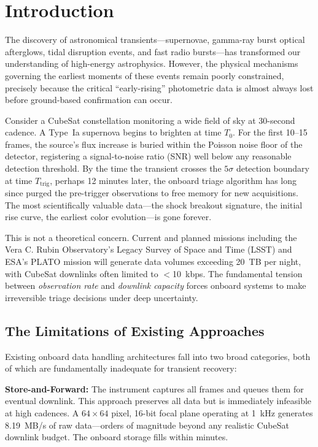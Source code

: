 \documentclass[conference]{IEEEtran}
\begin{document}
\section{Introduction}

The discovery of astronomical transients---supernovae, gamma-ray burst optical afterglows, tidal disruption events, and fast radio bursts---has transformed our understanding of high-energy astrophysics. However, the physical mechanisms governing the earliest moments of these events remain poorly constrained, precisely because the critical ``early-rising'' photometric data is almost always lost before ground-based confirmation can occur.

Consider a CubeSat constellation monitoring a wide field of sky at 30-second cadence. A Type~Ia supernova begins to brighten at time $T_0$. For the first 10--15 frames, the source's flux increase is buried within the Poisson noise floor of the detector, registering a signal-to-noise ratio (SNR) well below any reasonable detection threshold. By the time the transient crosses the $5\sigma$ detection boundary at time $T_{\text{trig}}$, perhaps 12 minutes later, the onboard triage algorithm has long since purged the pre-trigger observations to free memory for new acquisitions. The most scientifically valuable data---the shock breakout signature, the initial rise curve, the earliest color evolution---is gone forever.

This is not a theoretical concern. Current and planned missions including the Vera C. Rubin Observatory's Legacy Survey of Space and Time (LSST) and ESA's PLATO mission will generate data volumes exceeding 20~TB per night, with CubeSat downlinks often limited to $<$10~kbps. The fundamental tension between \textit{observation rate} and \textit{downlink capacity} forces onboard systems to make irreversible triage decisions under deep uncertainty.

\subsection{The Limitations of Existing Approaches}

Existing onboard data handling architectures fall into two broad categories, both of which are fundamentally inadequate for transient recovery:

\textbf{Store-and-Forward:} The instrument captures all frames and queues them for eventual downlink. This approach preserves all data but is immediately infeasible at high cadences. A $64 \times 64$ pixel, 16-bit focal plane operating at 1~kHz generates 8.19~MB/s of raw data---orders of magnitude beyond any realistic CubeSat downlink budget. The onboard storage fills within minutes.
\end{document}
